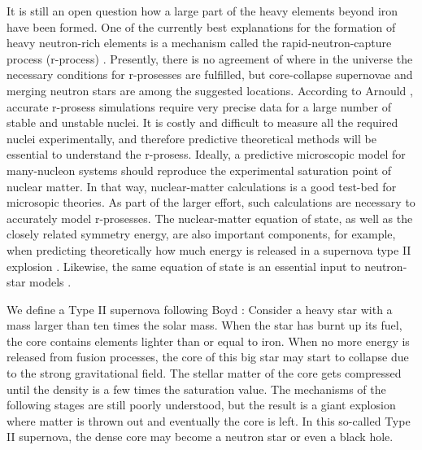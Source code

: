 \documentclass[a4paper,12pt]{report}
\begin{document}
It is still an open question how a large part of the heavy 
elements beyond iron have been formed. One of the 
currently best explanations for the formation of
heavy neutron-rich elements is a mechanism called
the rapid-neutron-capture process (r-process) 
\cite{arnould_2007,boyd_2008}. Presently, there is no 
agreement of where in the universe the necessary 
conditions for r-prosesses are fulfilled, but core-collapse 
supernovae and merging 
neutron stars are among the suggested locations.
According to Arnould \cite{arnould_2007}, accurate
r-prosess simulations require very precise data for 
a large number of stable and unstable nuclei. 
It is costly and difficult to measure all the required
nuclei experimentally, and therefore predictive 
theoretical methods will be essential to understand
the r-prosess\cite{arnould_2007}. Ideally, a predictive
microscopic model for many-nucleon systems should 
reproduce the experimental saturation point
of nuclear matter. In that way, nuclear-matter 
calculations is a good test-bed for microsopic theories.   
As part of the larger effort, such calculations are
necessary to accurately model r-prosesses. The nuclear-matter 
equation of state, as well as the closely related
symmetry energy, are also important components, for example, 
when predicting theoretically how much energy is released 
in a supernova type II explosion \cite{bethe_1990}. Likewise,
the same equation of state is an essential input to 
neutron-star models \cite{heiselberg,lattimer2012}.
 
We define a Type II supernova following Boyd 
\cite{boyd_2008}: Consider a heavy star with a mass 
larger than ten times the solar mass. When the star has burnt 
up its fuel, the core contains elements lighter than or equal 
to iron. When no more energy is released from fusion processes, 
the core of this big star may start to collapse due to the 
strong gravitational field. The stellar matter of the core 
gets compressed until the density is a few times the 
saturation value. The mechanisms of the following stages
are still poorly understood, but the result is a 
giant explosion where matter is thrown out and eventually
the core is left. In this so-called Type II supernova, 
the dense core may become a neutron star or even a black 
hole. 
\end{document}
